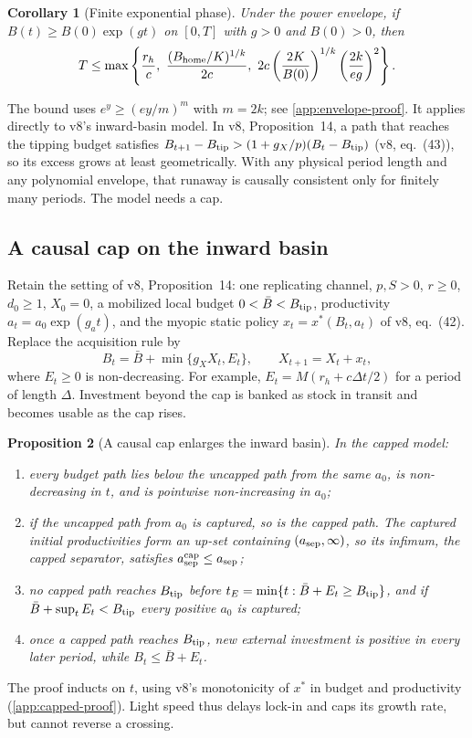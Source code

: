 \documentclass[11pt,a4paper]{article}
\newtheorem{proposition}{Proposition}
\newtheorem{corollary}[proposition]{Corollary}
\theoremstyle{definition}
\newcommand{\Btip}{B_{\rm tip}}
\begin{document}
\begin{corollary}[Finite exponential phase]
\label{cor:exp-phase}
Under the power envelope, if $B(t)\geq B(0)\exp(gt)$ on $[0,T]$ with $g>0$ and
$B(0)>0$, then
\begin{equation}
 T\leq\max\left\{\frac{r_h}{c},\
 \frac{(B_{\rm home}/K)^{1/k}}{2c},\
 2c\left(\frac{2K}{B(0)}\right)^{1/k}\left(\frac{2k}{eg}\right)^2\right\}.
 \label{eq:exp-phase}
\end{equation}
\end{corollary}
\noindent The bound uses $e^y\geq(ey/m)^m$ with $m=2k$; see
\cref{app:envelope-proof}. It applies directly to v8's inward-basin model. In
v8, Proposition~14, a path that reaches the tipping budget satisfies
$B_{t+1}-\Btip>(1+g_X/p)(B_t-\Btip)$ (v8, eq.~(43)), so its excess grows at least
geometrically. With any physical period length and any polynomial envelope,
that runaway is causally consistent only for finitely many periods. The model
needs a cap.

\subsection{A causal cap on the inward basin}
Retain the setting of v8, Proposition~14: one replicating channel,
$p,S>0$, $r\geq0$, $d_0\geq1$, $X_0=0$, a mobilized local budget
$0<\bar B<\Btip$, productivity $a_t=a_0\exp(g_at)$, and the myopic static policy
$x_t=x^*(B_t,a_t)$ of v8, eq.~(42). Replace the acquisition rule by
\begin{equation}
 B_t=\bar B+\min\{g_XX_t,E_t\},\qquad X_{t+1}=X_t+x_t,
 \label{eq:capped}
\end{equation}
where $E_t\geq0$ is non-decreasing. For example, $E_t=M(r_h+c\Delta t/2)$ for a
period of length $\Delta$. Investment beyond the cap is banked as stock in
transit and becomes usable as the cap rises.

\begin{proposition}[A causal cap enlarges the inward basin]
\label{prop:capped-basin}
In the capped model:
\begin{enumerate}[label=(\roman*),leftmargin=*,nosep]
\item every budget path lies below the uncapped path from the same $a_0$, is
non-decreasing in $t$, and is pointwise non-increasing in $a_0$;
\item if the uncapped path from $a_0$ is captured, so is the capped path. The
captured initial productivities form an up-set containing $(a_{\rm sep},\infty)$,
so its infimum, the capped separator, satisfies $a_{\rm sep}^{\rm cap}\leq a_{\rm sep}$;
\item no capped path reaches $\Btip$ before $t_E=\min\{t:\bar B+E_t\geq\Btip\}$,
and if $\bar B+\sup_tE_t<\Btip$ every positive $a_0$ is captured;
\item once a capped path reaches $\Btip$, new external investment is positive in
every later period, while $B_t\leq\bar B+E_t$.
\end{enumerate}
\end{proposition}
\noindent The proof inducts on $t$, using v8's monotonicity of $x^*$ in budget and
productivity (\cref{app:capped-proof}). Light speed thus delays lock-in and
caps its growth rate, but cannot reverse a crossing.
\end{document}
